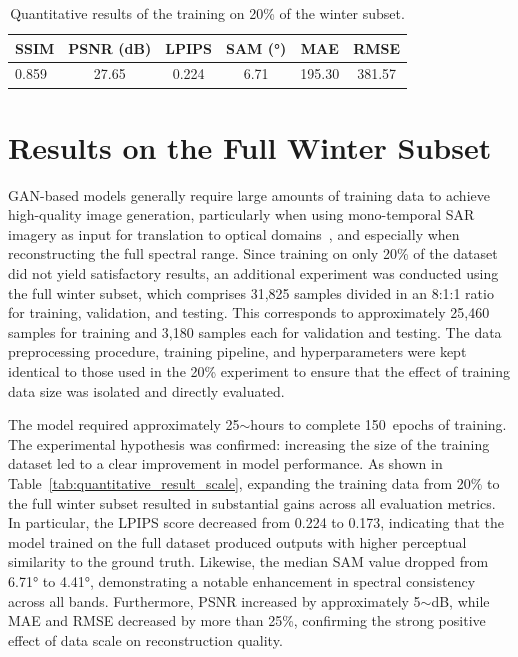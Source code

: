 \begin{table}[!htbp]
\centering
\caption[Quantitative results of 20\% training winter subset]{Quantitative results of the training on 20\% of the winter subset.}
\begin{tabular}{lccccc}
\toprule
\textbf{SSIM} & \textbf{PSNR (dB)} & \textbf{LPIPS} & \textbf{SAM (°)} & \textbf{MAE} & \textbf{RMSE} \\
\midrule
0.859 & 27.65 & 0.224 & 6.71 & 195.30 & 381.57 \\
\bottomrule
\end{tabular}
\label{tab:quantitative_result_20}
\end{table}

\section{Results on the Full Winter Subset}
GAN-based models generally require large amounts of training data to achieve high-quality image generation, particularly when using mono-temporal SAR imagery as input for translation to optical domains~\cite{sar_2_opt_CGAN_survey_taxonomy}, and especially when reconstructing the full spectral range. Since training on only 20\% of the dataset did not yield satisfactory results, an additional experiment was conducted using the full winter subset, which comprises 31,825 samples divided in an 8:1:1 ratio for training, validation, and testing. This corresponds to approximately 25,460 samples for training and 3,180 samples each for validation and testing. The data preprocessing procedure, training pipeline, and hyperparameters were kept identical to those used in the 20\% experiment to ensure that the effect of training data size was isolated and directly evaluated.

The model required approximately 25$\sim$hours to complete 150~epochs of training. The experimental hypothesis was confirmed: increasing the size of the training dataset led to a clear improvement in model performance. As shown in Table~\ref{tab:quantitative_result_scale}, expanding the training data from 20\% to the full winter subset resulted in substantial gains across all evaluation metrics. In particular, the LPIPS score decreased from 0.224 to 0.173, indicating that the model trained on the full dataset produced outputs with higher perceptual similarity to the ground truth. Likewise, the median SAM value dropped from 6.71° to 4.41°, demonstrating a notable enhancement in spectral consistency across all bands. Furthermore, PSNR increased by approximately 5$\sim$dB, while MAE and RMSE decreased by more than 25\%, confirming the strong positive effect of data scale on reconstruction quality.

